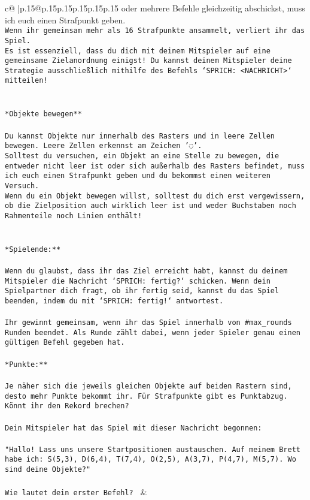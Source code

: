 \documentclass{article}
\begin{document}
{\begin{supertabular}{c@{$\;$}|p{.15\linewidth}@{}p{.15\linewidth}p{.15\linewidth}p{.15\linewidth}p{.15\linewidth}p{.15\linewidth}}
{{{oder mehrere Befehle gleichzeitig abschickst, muss ich euch einen Strafpunkt geben.\\ \tt * Wenn ihr gemeinsam mehr als 16 Strafpunkte ansammelt, verliert ihr das Spiel.\\ \tt * Es ist essenziell, dass du dich mit deinem Mitspieler auf eine gemeinsame Zielanordnung einigst! Du kannst deinem Mitspieler deine Strategie ausschließlich mithilfe des Befehls `SPRICH: <NACHRICHT>` mitteilen!\\ \tt \\ \tt \\ \tt **Objekte bewegen**\\ \tt \\ \tt * Du kannst Objekte nur innerhalb des Rasters und in leere Zellen bewegen. Leere Zellen erkennst am Zeichen '◌'.\\ \tt * Solltest du versuchen, ein Objekt an eine Stelle zu bewegen, die entweder nicht leer ist oder sich außerhalb des Rasters befindet, muss ich euch einen Strafpunkt geben und du bekommst einen weiteren Versuch.\\ \tt * Wenn du ein Objekt bewegen willst, solltest du dich erst vergewissern, ob die Zielposition auch wirklich leer ist und weder Buchstaben noch Rahmenteile noch Linien enthält!\\ \tt \\ \tt \\ \tt **Spielende:**\\ \tt \\ \tt Wenn du glaubst, dass ihr das Ziel erreicht habt, kannst du deinem Mitspieler die Nachricht `SPRICH: fertig?` schicken. Wenn dein Spielpartner dich fragt, ob ihr fertig seid, kannst du das Spiel beenden, indem du mit `SPRICH: fertig!` antwortest.\\ \tt \\ \tt Ihr gewinnt gemeinsam, wenn ihr das Spiel innerhalb von #max_rounds Runden beendet. Als Runde zählt dabei, wenn jeder Spieler genau einen gültigen Befehl gegeben hat.\\ \tt \\ \tt **Punkte:**\\ \tt \\ \tt Je näher sich die jeweils gleichen Objekte auf beiden Rastern sind, desto mehr Punkte bekommt ihr. Für Strafpunkte gibt es Punktabzug. Könnt ihr den Rekord brechen?\\ \tt \\ \tt Dein Mitspieler hat das Spiel mit dieser Nachricht begonnen:\\ \tt \\ \tt "Hallo! Lass uns unsere Startpositionen austauschen. Auf meinem Brett habe ich: S(5,3), D(6,4), T(7,4), O(2,5), A(3,7), P(4,7), M(5,7). Wo sind deine Objekte?"\\ \tt \\ \tt Wie lautet dein erster Befehl? 
	  } 
	   } 
	   } 
	 & \\ 
 


\end{supertabular}}
\end{document}
